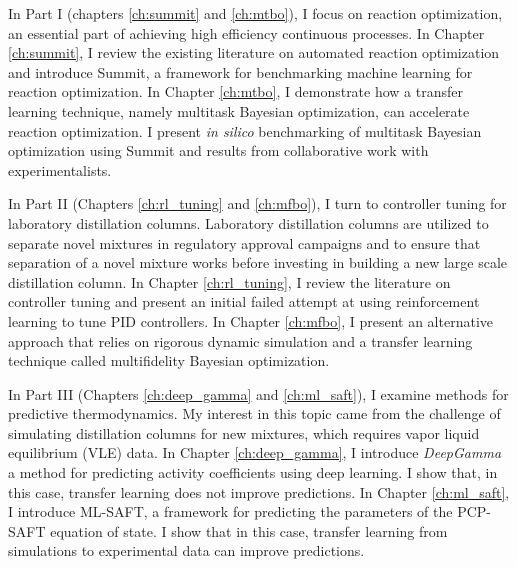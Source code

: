 In Part I (chapters \ref{ch:summit} and \ref{ch:mtbo}), I focus on reaction optimization, an essential part of achieving high efficiency continuous processes. In Chapter \ref{ch:summit}, I review the existing literature on automated reaction optimization and introduce Summit, a framework for benchmarking machine learning for reaction optimization.  In Chapter \ref{ch:mtbo}, I demonstrate how a transfer learning technique, namely multitask Bayesian optimization, can accelerate reaction optimization. I present \textit{in silico} benchmarking of multitask Bayesian optimization using Summit and results from collaborative work with experimentalists.

In Part II (Chapters \ref{ch:rl_tuning} and \ref{ch:mfbo}), I turn to controller tuning for laboratory distillation columns. Laboratory distillation columns are utilized to separate novel mixtures in regulatory approval campaigns and to ensure that separation of a novel mixture works before investing in building a new large scale distillation column. In Chapter \ref{ch:rl_tuning}, I review the literature on controller tuning and present an initial failed attempt at using reinforcement learning to tune PID controllers. In Chapter \ref{ch:mfbo}, I present an alternative approach that relies on rigorous dynamic simulation and a transfer learning technique called multifidelity Bayesian optimization.

In Part III (Chapters \ref{ch:deep_gamma} and \ref{ch:ml_saft}), I examine methods for predictive thermodynamics. My interest in this topic came from the challenge of simulating distillation columns for new mixtures, which requires vapor liquid equilibrium (VLE) data. In Chapter \ref{ch:deep_gamma}, I introduce \textit{DeepGamma} a method for predicting activity coefficients using deep learning. I show that, in this case, transfer learning does not improve predictions. In Chapter \ref{ch:ml_saft}, I introduce ML-SAFT, a framework for predicting the parameters of the PCP-SAFT equation of state. I show that in this case, transfer learning from simulations to experimental data can improve predictions.





